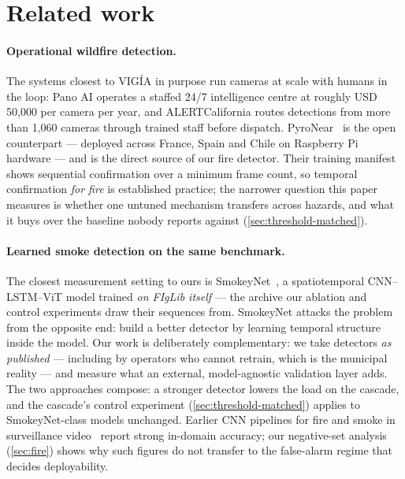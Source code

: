 \section{Related work}
\label{sec:related}

\paragraph{Operational wildfire detection.} The systems closest to VIGÍA in
purpose run cameras at scale with humans in the loop: Pano AI operates a
staffed 24/7 intelligence centre at roughly USD 50{,}000 per camera per year,
and ALERTCalifornia routes detections from more than 1{,}060 cameras through
trained staff before dispatch. PyroNear~\citep{pyronear2025} is the open
counterpart — deployed across France, Spain and Chile on Raspberry Pi
hardware — and is the direct source of our fire detector. Their training
manifest shows sequential confirmation over a minimum frame count, so
temporal confirmation \emph{for fire} is established practice; the narrower
question this paper measures is whether one untuned mechanism transfers
across hazards, and what it buys over the baseline nobody reports against
(\cref{sec:threshold-matched}).

\paragraph{Learned smoke detection on the same benchmark.}
The closest measurement setting to ours is
SmokeyNet~\citep{dewangan2022smokeynet}, a spatiotemporal CNN--LSTM--ViT
model trained \emph{on FIgLib itself} — the archive our ablation and control
experiments draw their sequences from. SmokeyNet attacks the problem from
the opposite end: build a better detector by learning temporal structure
inside the model. Our work is deliberately complementary: we take detectors
\emph{as published} — including by operators who cannot retrain, which is
the municipal reality — and measure what an external, model-agnostic
validation layer adds. The two approaches compose: a stronger detector
lowers the load on the cascade, and the cascade's control experiment
(\cref{sec:threshold-matched}) applies to SmokeyNet-class models unchanged.
Earlier CNN pipelines for fire and smoke in surveillance
video~\citep{muhammad2018fire} report strong in-domain accuracy; our
negative-set analysis (\cref{sec:fire}) shows why such figures do not
transfer to the false-alarm regime that decides deployability.


